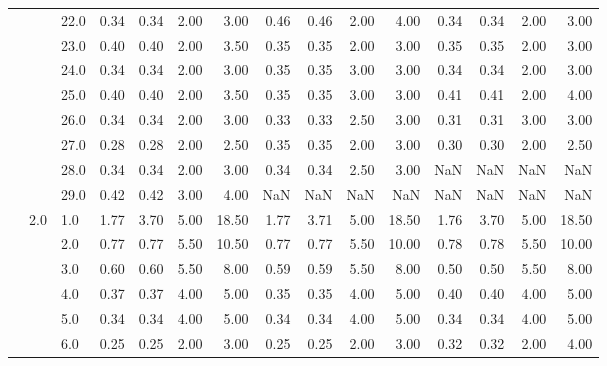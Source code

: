 \begin{tabular}{lllrrrrrrrrrrrr}
       &     & 22.0 &       0.34 &      0.34 & 2.00 &   3.00 &       0.46 &      0.46 & 2.00 &   4.00 &       0.34 &      0.34 & 2.00 &   3.00 \\
       &     & 23.0 &       0.40 &      0.40 & 2.00 &   3.50 &       0.35 &      0.35 & 2.00 &   3.00 &       0.35 &      0.35 & 2.00 &   3.00 \\
       &     & 24.0 &       0.34 &      0.34 & 2.00 &   3.00 &       0.35 &      0.35 & 3.00 &   3.00 &       0.34 &      0.34 & 2.00 &   3.00 \\
       &     & 25.0 &       0.40 &      0.40 & 2.00 &   3.50 &       0.35 &      0.35 & 3.00 &   3.00 &       0.41 &      0.41 & 2.00 &   4.00 \\
       &     & 26.0 &       0.34 &      0.34 & 2.00 &   3.00 &       0.33 &      0.33 & 2.50 &   3.00 &       0.31 &      0.31 & 3.00 &   3.00 \\
       &     & 27.0 &       0.28 &      0.28 & 2.00 &   2.50 &       0.35 &      0.35 & 2.00 &   3.00 &       0.30 &      0.30 & 2.00 &   2.50 \\
       &     & 28.0 &       0.34 &      0.34 & 2.00 &   3.00 &       0.34 &      0.34 & 2.50 &   3.00 &        NaN &       NaN &  NaN &    NaN \\
       &     & 29.0 &       0.42 &      0.42 & 3.00 &   4.00 &        NaN &       NaN &  NaN &    NaN &        NaN &       NaN &  NaN &    NaN \\
       & 2.0 & 1.0  &       1.77 &      3.70 & 5.00 &  18.50 &       1.77 &      3.71 & 5.00 &  18.50 &       1.76 &      3.70 & 5.00 &  18.50 \\
       &     & 2.0  &       0.77 &      0.77 & 5.50 &  10.50 &       0.77 &      0.77 & 5.50 &  10.00 &       0.78 &      0.78 & 5.50 &  10.00 \\
       &     & 3.0  &       0.60 &      0.60 & 5.50 &   8.00 &       0.59 &      0.59 & 5.50 &   8.00 &       0.50 &      0.50 & 5.50 &   8.00 \\
       &     & 4.0  &       0.37 &      0.37 & 4.00 &   5.00 &       0.35 &      0.35 & 4.00 &   5.00 &       0.40 &      0.40 & 4.00 &   5.00 \\
       &     & 5.0  &       0.34 &      0.34 & 4.00 &   5.00 &       0.34 &      0.34 & 4.00 &   5.00 &       0.34 &      0.34 & 4.00 &   5.00 \\
       &     & 6.0  &       0.25 &      0.25 & 2.00 &   3.00 &       0.25 &      0.25 & 2.00 &   3.00 &       0.32 &      0.32 & 2.00 &   4.00 \\

\end{tabular}
